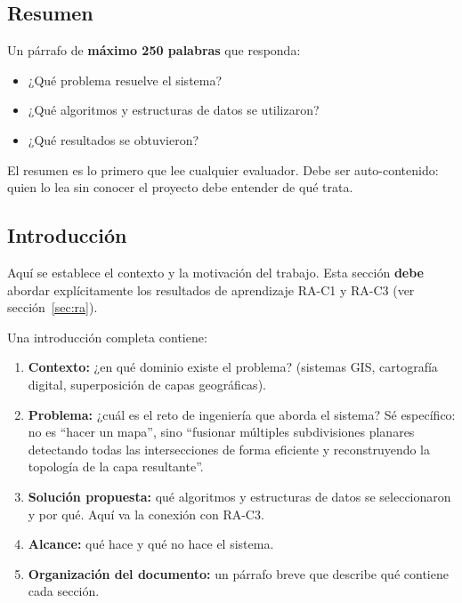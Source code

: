 \documentclass[12pt, oneside]{article}
\begin{document}
\subsection{Resumen}

Un párrafo de \textbf{máximo 250 palabras} que responda:

\begin{itemize}
  \item ¿Qué problema resuelve el sistema?
  \item ¿Qué algoritmos y estructuras de datos se utilizaron?
  \item ¿Qué resultados se obtuvieron?
\end{itemize}

El resumen es lo primero que lee cualquier evaluador.  Debe ser
auto-contenido: quien lo lea sin conocer el proyecto debe entender
de qué trata.

\subsection{Introducción}

Aquí se establece el contexto y la motivación del trabajo.  Esta
sección \textbf{debe} abordar explícitamente los resultados de
aprendizaje RA-C1 y RA-C3 (ver sección~\ref{sec:ra}).

Una introducción completa contiene:

\begin{enumerate}
  \item \textbf{Contexto:} ¿en qué dominio existe el problema?
        (sistemas GIS, cartografía digital, superposición de capas
        geográficas).

  \item \textbf{Problema:} ¿cuál es el reto de ingeniería que aborda
        el sistema?  Sé específico: no es ``hacer un mapa'', sino
        ``fusionar múltiples subdivisiones planares detectando todas
        las intersecciones de forma eficiente y reconstruyendo la
        topología de la capa resultante''.

  \item \textbf{Solución propuesta:} qué algoritmos y estructuras de
        datos se seleccionaron y por qué.  Aquí va la conexión con
        RA-C3.

  \item \textbf{Alcance:} qué hace y qué no hace el sistema.

  \item \textbf{Organización del documento:} un párrafo breve que
        describe qué contiene cada sección.
\end{enumerate}
\end{document}
